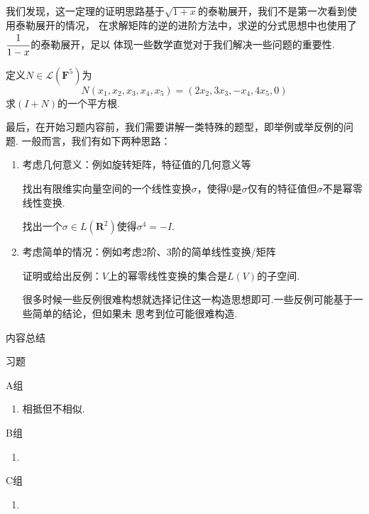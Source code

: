 我们发现，这一定理的证明思路基于$\sqrt{1+x}$的泰勒展开，我们不是第一次看到使用泰勒展开的情况，
在求解矩阵的逆的进阶方法中，求逆的分式思想中也使用了$\cfrac{1}{1-x}$的泰勒展开，足以
体现一些数学直觉对于我们解决一些问题的重要性.
\begin{example}
    定义$N\in \mathcal{L}(\mathbf{F}^5)$为
    \[N(x_1,x_2,x_3,x_4,x_5)=(2x_2,3x_3,-x_4,4x_5,0)\]
    求$(I+N)$的一个平方根.
\end{example}
\begin{solution}

\end{solution}

最后，在开始习题内容前，我们需要讲解一类特殊的题型，即举例或举反例的问题.
一般而言，我们有如下两种思路：
\begin{enumerate}
	\item 考虑几何意义：例如旋转矩阵，特征值的几何意义等
	\begin{example}
		找出有限维实向量空间的一个线性变换$\sigma$，使得$0$是$\sigma$仅有的特征值但$\sigma$不是幂零线性变换.
	\end{example}
	\begin{example}
		找出一个$\sigma\in L(\mathbf{R}^2)$使得$\sigma^4=-I$.
	\end{example}
	\item 考虑简单的情况：例如考虑2阶、3阶的简单线性变换/矩阵
	\begin{example}
		证明或给出反例：$V$上的幂零线性变换的集合是$L(V)$的子空间.
	\end{example}
	很多时候一些反例很难构想就选择记住这一构造思想即可.一些反例可能基于一些简单的结论，但如果未
	思考到位可能很难构造.
\end{enumerate}

\vspace{2ex}
\centerline{\heiti \Large 内容总结}

\vspace{2ex}

\centerline{\heiti \Large 习题}
\vspace{2ex}
{\kaishu }
\begin{flushright}
    \kaishu

\end{flushright}

\centerline{\heiti A组}
\begin{enumerate}
    \item 相抵但不相似.
\end{enumerate}
\centerline{\heiti B组}
\begin{enumerate}
    \item 
\end{enumerate}
\centerline{\heiti C组}
\begin{enumerate}
    \item
\end{enumerate}
